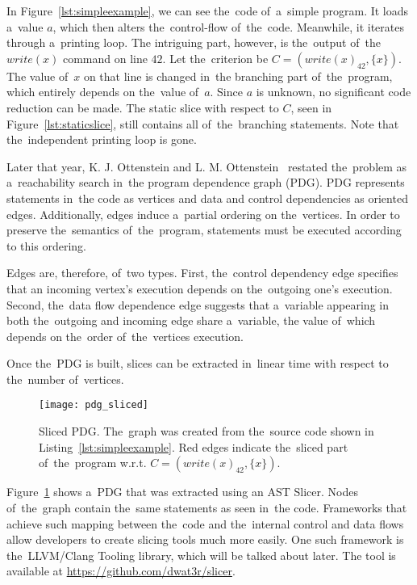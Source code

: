 In Figure~\ref{lst:simpleexample}, we can see the~code of~a~simple program.
It loads a~value $a$, which then alters the~control-flow of~the~code.
Meanwhile, it iterates through a~printing loop. 
The intriguing part, however, is the~output of~the~$write(x)$ 
command on line $42$. 
Let the~criterion be $C = (write(x)_{42}, \{x\})$. 
The value of~$x$ on that line is changed in~the branching 
part of~the~program, which entirely depends on the~value of~$a$.
Since $a$ is unknown, no significant code reduction can be made. 
The static slice with respect to $C$, seen in Figure~\ref{lst:staticslice}, 
still contains all of~the~branching statements. 
Note that the~independent printing loop is gone.

Later that year, K. J. Ottenstein and L. M. Ottenstein~\citep*{Ottenstein84}
restated the~problem as a~reachability
search in~the program dependence graph (PDG).
PDG represents statements in~the code as vertices and data and control
dependencies as oriented edges. 
Additionally, edges induce a~partial ordering on the~vertices. 
In order to preserve the~semantics of~the~program, statements must be executed 
according to this ordering. 

Edges are, therefore, of~two types. 
First, the~control dependency edge specifies that an incoming vertex's 
execution depends on the~outgoing one's execution. 
Second, the~data flow dependence edge suggests that a~variable appearing
in both the~outgoing and incoming edge share a~variable,
the value of~which depends on the~order of~the~vertices execution.

Once the~PDG is built, slices can be extracted in~linear time 
with respect to the~number of~vertices.

\begin{figure}[ht]\centering
\texttt{[image: pdg\_sliced]}
\caption{Sliced PDG. The~graph was created from the~source 
code shown in Listing~\ref{lst:simpleexample}.
Red edges indicate the~sliced part of~the~program w.r.t.
$C = (write(x)_{42}, \{x\})$.}
\label{img:pdg}
\end{figure}

Figure~\ref{img:pdg} shows a~PDG that was extracted using an AST Slicer.
Nodes of~the~graph contain the~same statements as seen in~the code.
Frameworks that achieve such mapping between the~code and the~internal
control and data flows allow developers to create slicing tools much 
more easily.
One such framework is the~LLVM/Clang Tooling library, which will be
talked about later.
The tool is available at \url{https://github.com/dwat3r/slicer}.


